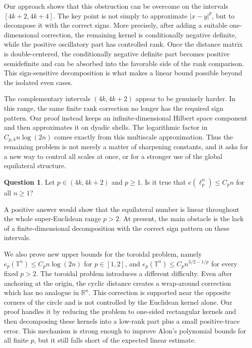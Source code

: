 \documentclass[11pt]{article}
\theoremstyle{definition}
\newtheorem{ques}[theorem]{Question}
\begin{document}
Our approach shows that this obstruction can be overcome on the intervals
\([4k+2,4k+4]\). The key point is not simply to approximate \(|x-y|^p\), but to
decompose it with the correct signs. More precisely, after adding a suitable
one-dimensional correction, the remaining kernel is conditionally negative
definite, while the positive oscillatory part has controlled rank. Once the
distance matrix is double-centered, the conditionally negative definite part
becomes positive semidefinite and can be absorbed into the favorable side of the
rank comparison. This sign-sensitive decomposition is what makes a linear bound
possible beyond the isolated even cases.

The complementary intervals \((4k,4k+2)\) appear to be genuinely harder. In this
range, the same finite rank correction no longer has the required sign pattern.
Our proof instead keeps an infinite-dimensional Hilbert space component and
then approximates it on dyadic shells. The logarithmic factor in
\(C_{p,k}n\log(2n)\) comes exactly from this multiscale approximation. Thus the
remaining problem is not merely a matter of sharpening constants, and it asks for a
new way to control all scales at once, or for a stronger use of the global
equilateral structure.

\begin{ques}
Let  \(p\in(4k,4k+2)\) and \(p\geq 1\). Is it true that
\(
e(\ell_p^n)\le C_{p}n
\)
for all \(n\ge1\)?
\end{ques}

A positive answer would show that the equilateral number is linear throughout
the whole super-Euclidean range \(p>2\). At
present, the main obstacle is the lack of a finite-dimensional decomposition
with the correct sign pattern on these intervals.

We also prove new upper bounds for the toroidal problem, namely
\(
e_p(\mathbb T^n)\le C_p n\log(2n)
\)
for \(p\in[1,2]\), and
\(
e_p(\mathbb T^n)\le C_p n^{3/2-1/p}
\)
for every fixed \(p>2\).
The toroidal problem introduces a different difficulty. Even after anchoring at
the origin, the cyclic distance creates a wrap-around correction which has no
analogue in \(\mathbb R^n\). This correction is supported near the opposite
corners of the circle and is not controlled by the Euclidean kernel alone. Our
proof handles it by reducing the problem to one-sided rectangular kernels and
then decomposing these kernels into a low-rank part plus a small positive-trace
error. This mechanism is strong enough to improve Alon's polynomial bounds for
all finite \(p\), but it still falls short of the expected linear estimate.
\end{document}
